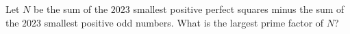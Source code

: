 Let $N$ be the sum of the $2023$ smallest positive perfect squares minus the sum of the $2023$ smallest positive odd numbers. What is the largest prime factor of $N$?
